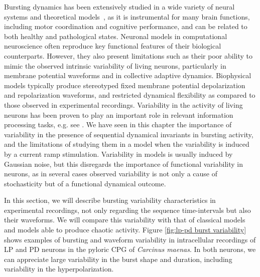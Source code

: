 Bursting dynamics has been extensively studied in a wide variety of neural systems and theoretical models~\parencite{coombes2005bursting,izhikevich_dynamical_2007,Zendenrust18}, as it is instrumental for many brain functions, including motor coordination and cognitive performance, and can be related to both healthy and pathological states. Neuronal models in computational neuroscience often reproduce key functional features of their biological counterparts. However, they also present limitations such as their poor ability to mimic the observed intrinsic variability of living neurons, particularly in membrane potential waveforms and in collective adaptive dynamics. Biophysical models typically produce stereotyped fixed membrane potential depolarization and repolarization waveforms, and restricted dynamical flexibility as compared to those observed in experimental recordings. Variability in the activity of living neurons has been proven to play an important role in relevant information processing tasks, e.g. see  \parencite{Stein2005, renart_variability_2014, Waschke2021}. We have seen in this chapter the importance of variability in the presence of sequential dynamical invariants in bursting activity, and the limitations of studying them in a model when the variability is induced by a current ramp stimulation. Variability in models is usually induced by Gaussian noise, but this disregards the importance of functional variability in  neurons, as in several cases observed variability is not only a cause of stochasticity  but of a functional dynamical  outcome. 

In this section, we will describe bursting variability characteristics in experimental recordings, not only regarding the sequence time-intervals but also their waveforms. We will compare this variability with that of classical models and models able to produce chaotic activity. 
Figure \ref{fig:lp-pd burst variability} shows examples of  bursting and waveform variability in  intracellular recordings of LP and PD neurons in the pyloric CPG of \textit{Carcinus maenas}. In both neurons, we can appreciate large variability in the burst shape and duration, including variability in the hyperpolarization.

